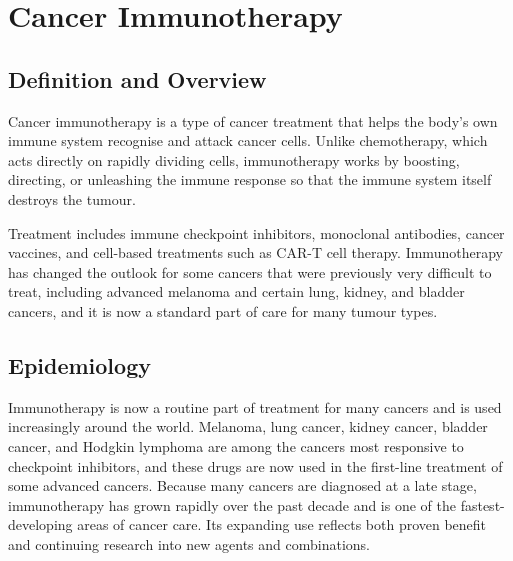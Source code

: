 \chapter{Cancer Immunotherapy}

\section*{Definition and Overview}
Cancer immunotherapy is a type of cancer treatment that helps the body's own immune system recognise and attack cancer cells. Unlike chemotherapy, which acts directly on rapidly dividing cells, immunotherapy works by boosting, directing, or unleashing the immune response so that the immune system itself destroys the tumour.

Treatment includes immune checkpoint inhibitors, monoclonal antibodies, cancer vaccines, and cell-based treatments such as CAR-T cell therapy. Immunotherapy has changed the outlook for some cancers that were previously very difficult to treat, including advanced melanoma and certain lung, kidney, and bladder cancers, and it is now a standard part of care for many tumour types.

\section*{Epidemiology}
Immunotherapy is now a routine part of treatment for many cancers and is used increasingly around the world. Melanoma, lung cancer, kidney cancer, bladder cancer, and Hodgkin lymphoma are among the cancers most responsive to checkpoint inhibitors, and these drugs are now used in the first-line treatment of some advanced cancers. Because many cancers are diagnosed at a late stage, immunotherapy has grown rapidly over the past decade and is one of the fastest-developing areas of cancer care. Its expanding use reflects both proven benefit and continuing research into new agents and combinations.

